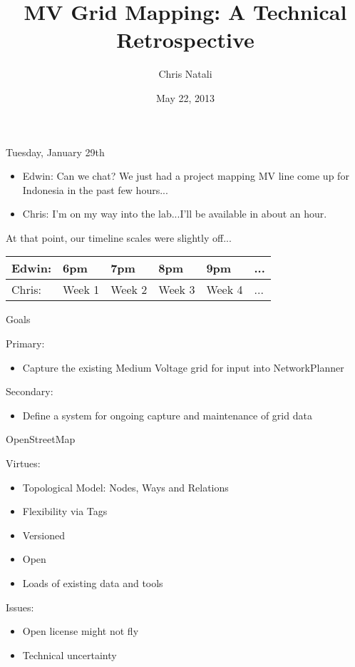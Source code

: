 \documentclass{beamer}
\title{MV Grid Mapping:  A Technical Retrospective}
\author{Chris Natali}
\institute{Modi Labs at Columbia University}
\date{May 22, 2013}
\begin{document}
\begin{frame}
  Tuesday, January 29th

  \bigskip
  \begin{itemize}
  \item[] Edwin:  Can we chat?  We just had a project mapping MV line come up for Indonesia in the past few hours...
  \item[] Chris:  I'm on my way into the lab...I'll be available in about an hour.
  \end{itemize}

  \bigskip 
  At that point, our timeline scales were slightly off...

  \bigskip 

  \begin{tabular}{|l|l|l|l|l|l|}
    Edwin: & 6pm & 7pm & 8pm & 9pm & ...\\
    \hline
    Chris: & Week 1 & Week 2 & Week 3 & Week 4 & ...\\
  \end{tabular}

\end{frame}

\begin{frame}{Goals}
  
  Primary: 
  \begin{itemize}
  \item[] Capture the existing Medium Voltage grid for input into NetworkPlanner
  \end{itemize}

  \bigskip 

  Secondary: 
  \begin{itemize}
  \item[] Define a system for ongoing capture and maintenance of grid data 
  \end{itemize}

\end{frame}

\begin{frame}{OpenStreetMap}
  
  Virtues:
  \begin{itemize}
  \item[] Topological Model:  Nodes, Ways and Relations
  \item[] Flexibility via Tags
  \item[] Versioned
  \item[] Open
  \item[] Loads of existing data and tools
  \end{itemize}


  \bigskip 

  Issues:
  \begin{itemize}
  \item[] Open license might not fly
  \item[] Technical uncertainty
  \end{itemize}

\end{frame}
\end{document}
